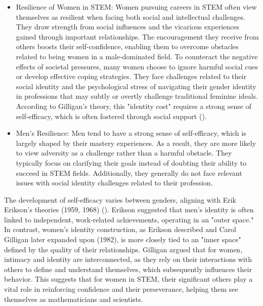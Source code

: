 \begin{itemize}
    \item Resilience of Women in STEM: Women pursuing careers in STEM often view themselves as resilient when facing both social and intellectual challenges. They draw strength from social influences and the vicarious experiences gained through important relationships. The encouragement they receive from others boosts their self-confidence, enabling them to overcome obstacles related to being women in a male-dominated field. To counteract the negative effects of societal pressures, many women choose to ignore harmful social cues or develop effective coping strategies. They face challenges related to their social identity and the psychological stress of navigating their gender identity in professions that may subtly or overtly challenge traditional feminine ideals. According to Gilligan's theory, this "identity cost" requires a strong sense of self-efficacy, which is often fostered through social support (\cite{Gilligan1993}).
    \item Men's Resilience: Men tend to have a strong sense of self-efficacy, which is largely shaped by their mastery experiences. As a result, they are more likely to view adversity as a challenge rather than a harmful obstacle. They typically focus on clarifying their goals instead of doubting their ability to succeed in STEM fields. Additionally, they generally do not face relevant issues with social identity challenges related to their profession.
\end{itemize}
The development of self-efficacy varies between genders, aligning with Erik Erikson's theories (1959, 1968) (\cite{Zel}). Erikson suggested that men's identity is often linked to independent, work-related achievements, operating in an "outer space." In contrast, women's identity construction, as Erikson described and Carol Gilligan later expanded upon (1982), is more closely tied to an "inner space" defined by the quality of their relationships. Gilligan argued that for women, intimacy and identity are interconnected, as they rely on their interactions with others to define and understand themselves, which subsequently influences their behavior. This suggests that for women in STEM, their significant others play a vital role in reinforcing confidence and their perseverance, helping them see themselves as mathematicians and scientists.

